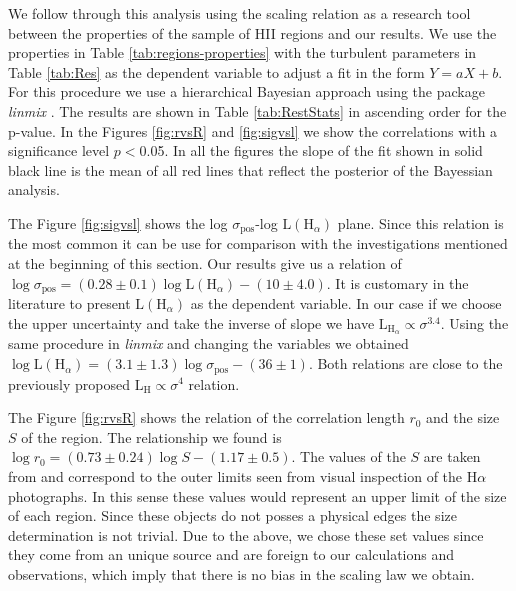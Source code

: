 \documentclass[fleqn,usenatbib, useAMS, a4paper]{mnras}
\newcommand\pos{\ensuremath{_{\mathrm{pos}}}}
\newcommand\ha{\ensuremath{\text{H}\alpha}}
\begin{document}
We follow through this analysis using the scaling relation as a research tool between the properties of the sample of HII regions and our results. 
We use the properties in Table \ref{tab:regions-properties} with the turbulent parameters in Table \ref{tab:Res} as the dependent variable to adjust a fit in the form \(Y = aX +b\). 
For this procedure we use a hierarchical Bayesian approach using the package \textit{linmix} \citep{2007ApJ...665.1489K}.
The results are shown in Table \ref{tab:RestStats} in ascending order for the p-value.
In the Figures \ref{fig:rvsR} and \ref{fig:sigvsl} we show the correlations with a significance level  $p < $0.05.
In all the figures the slope of the fit shown in solid black line is the mean of all red lines that reflect the posterior of the Bayessian analysis.

The Figure \ref{fig:sigvsl} shows the log \(\sigma\pos\)-log \(\text{L}(\text{H}_{\alpha})\) plane.
Since this relation is the most common it can be use for comparison with the investigations mentioned at the beginning of this section.
Our results give us a relation of \(\log \sigma\pos = (0.28 \pm 0.1) \log \text{L}(\text{H}_{\alpha})-(10 \pm 4.0)\).
It is customary in the literature to present \(\text{L} (\text{H}_{\alpha})\) as the dependent variable.
In our case if we choose the upper uncertainty and take the inverse of slope we have \(\text{L}_{\text{H}_{\alpha}} \propto \sigma^{3.4}\). 
Using the same procedure in \textit{linmix} and changing the variables we obtained \(\log \text{L}(\text{H}_{\alpha}) = (3.1\pm 1.3) \log \sigma\pos -(36 \pm 1)\).
Both relations are close to the previously proposed \(\text{L}_{\text{H}} \propto \sigma^{4}\) relation.

The Figure \ref{fig:rvsR} shows the relation of the correlation length \(r_0\) and the size \(S\) of the region. 
The relationship we found is \(\log r_0 = (0.73 \pm 0.24) \log S - (1.17 \pm 0.5)\).
The values of the \(S\) are taken from \citet{1984ApJ...287..116K} and correspond to the outer
limits seen from visual inspection of the \ha{} photographs.
In this sense these values would represent an upper limit of the size of each region.
Since these objects do not posses a physical edges the size determination is not trivial.
Due to the above, we chose these set values since they come from an unique source and are foreign to our calculations and observations, which imply that there is no bias in the scaling law we obtain.  
\end{document}
